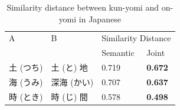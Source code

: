 \vspace{0.4cm}    
\begin{table}[h]
    \centering
    \begin{CJK}{UTF8}{ipxm}
        \begin{tabularx}{\textwidth}{bbbb}
            \toprule
            \multirow{2.5}{*}{A} & \multirow{2.5}{*}{B} & \multicolumn{2}{c}{Similarity Distance} \\
            \cmidrule(lr){3-4} {} & {} & Semantic & Joint \\\midrule
            土 (つち) & 土 (と) 地 & 0.719 & \textbf{0.672} \\
            海 (うみ) & 深海 (かい) & 0.707 & \textbf{0.637} \\
            時 (とき) & 時 (じ) 間 & 0.578 & \textbf{0.498} \\\bottomrule
        \end{tabularx}
    \end{CJK}
    \caption{Similarity distance between kun-yomi and on-yomi in Japanese}
    \label{tab:analysis_heteronym3}
\end{table}
